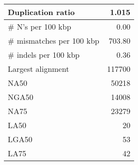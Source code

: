\documentclass[12pt,a4paper]{article}
\begin{document}
\begin{table}[ht]
\begin{center}
\begin{tabular}{|l*{1}{|r}|}
Duplication ratio & 1.015 \\ \hline
\# N's per 100 kbp & 0.00 \\ \hline
\# mismatches per 100 kbp & 703.80 \\ \hline
\# indels per 100 kbp & 0.36 \\ \hline
Largest alignment & 117700 \\ \hline
NA50 & 50218 \\ \hline
NGA50 & 14008 \\ \hline
NA75 & 23279 \\ \hline
LA50 & 20 \\ \hline
LGA50 & 53 \\ \hline
LA75 & 42 \\ \hline
\end{tabular}
\end{center}
\end{table}
\end{document}
